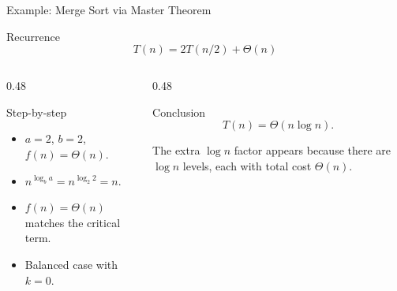\documentclass[aspectratio=169]{beamer}
\begin{document}
\begin{frame}{Example: Merge Sort via Master Theorem}
  \small
  \begin{block}{Recurrence}
    \[
      T(n)=2T(n/2)+\Theta(n)
    \]
  \end{block}
  \begin{columns}[T]
    \begin{column}{0.48\textwidth}
      \begin{exampleblock}{Step-by-step}
        \begin{itemize}
          \item $a=2$, $b=2$, $f(n)=\Theta(n)$.
          \item $n^{\log_b a}=n^{\log_2 2}=n$.
          \item $f(n)=\Theta(n)$ matches the critical term.
          \item Balanced case with $k=0$.
        \end{itemize}
      \end{exampleblock}
    \end{column}
    \begin{column}{0.48\textwidth}
      \begin{alertblock}{Conclusion}
        \[
          T(n)=\Theta(n\log n).
        \]
      \end{alertblock}
      \begin{tcolorbox}[colframe=ForestGreen,colback=SoftGreen!35,arc=1.5mm]
        \centering\small
        The extra $\log n$ factor appears because there are $\log n$ levels, each with total cost $\Theta(n)$.
      \end{tcolorbox}
    \end{column}
  \end{columns}
\end{frame}
\end{document}
